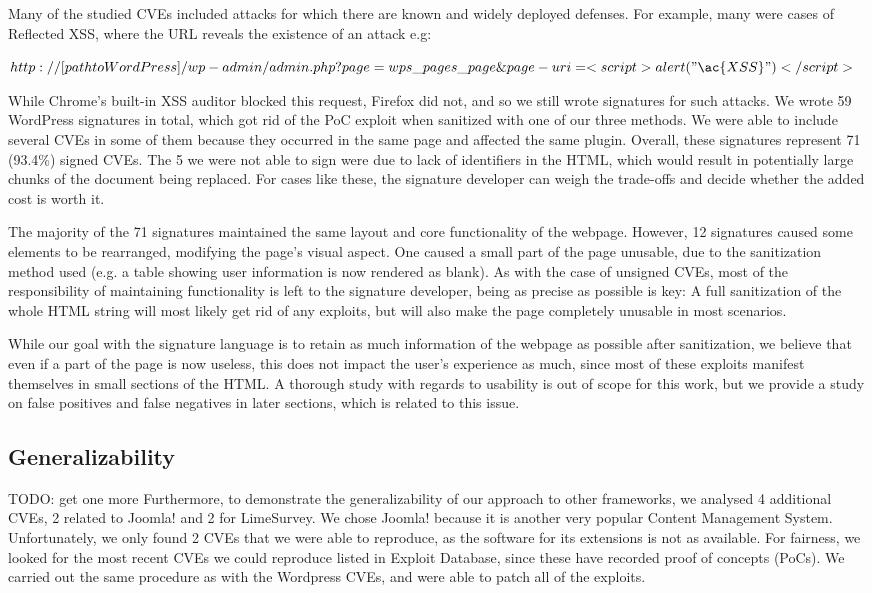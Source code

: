 Many of the studied CVEs included attacks for which there are known and widely deployed defenses. For example, many were cases of Reflected \ac{XSS}, where the URL reveals the existence of an attack e.g:


$http://[path to WordPress]/wp-admin/admin.php?page=wps\_pages\_page\&page-uri=<script>alert("\ac{XSS}")</script>$

While Chrome's built-in \ac{XSS} auditor blocked this request, Firefox did not, and so we still wrote signatures for such attacks. We wrote 59 WordPress signatures in total, which got rid of the PoC exploit when sanitized with one of our three methods. We were able to include several CVEs in some of them because they occurred in the same page and affected the same plugin. Overall, these signatures represent 71 (93.4\%) signed CVEs. The 5 we were not able to sign were due to lack of identifiers in the HTML, which would result in potentially large chunks of the document being replaced. For cases like these, the signature developer can weigh the trade-offs and decide whether the added cost is worth it.

The majority of the 71 signatures maintained the same layout and core functionality of the webpage. However, 12 signatures caused some elements to be rearranged, modifying the page's visual aspect. One caused a small part of the page unusable, due to the sanitization method used (e.g. a table showing user information is now rendered as blank). As with the case of unsigned CVEs, most of the responsibility of maintaining functionality is left to the signature developer, being as precise as possible is key: A full sanitization of the whole HTML string will most likely get rid of any exploits, but will also make the page completely unusable in most scenarios.

While our goal with the signature language is to retain as much information of the webpage as possible after sanitization, we believe that even if a part of the page is now useless, this does not impact the user's experience as much, since most of these exploits manifest themselves in small sections of the HTML. A thorough study with regards to usability is out of scope for this work, but we provide a study on false positives and false negatives in later sections, which is related to this issue.

\subsection{Generalizability}
TODO: get one more
Furthermore, to demonstrate the generalizability of our approach to other frameworks, we analysed 4 additional CVEs, 2 related to Joomla! and 2 for LimeSurvey. We chose Joomla! because it is another very popular Content Management System. Unfortunately, we only found 2 CVEs that we were able to reproduce, as the software for its extensions is not as available. For fairness, we looked for the most recent CVEs we could reproduce listed in Exploit Database, since these have recorded proof of concepts (PoCs). We carried out the same procedure as with the Wordpress CVEs, and were able to patch all of the exploits. 

